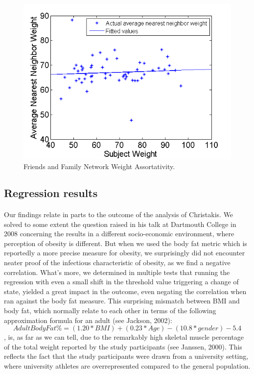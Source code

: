 \documentclass[11pt]{article}
\begin{document}
\begin{figure}[!ht]
\center
   \includegraphics[scale=0.72]{weight_assortativity_figure3.png}
   \caption{\label{3} Friends and Family Network Weight Assortativity.}
\end{figure}


\subsection{Regression results}
\paragraph{}
Our findings relate in parts to the outcome of the analysis of Christakis. We solved to some extent the question raised in his talk at Dartmouth College in 2008 concerning the results in a different socio-economic environment, where perception of obesity is different. But when we used the body fat metric which is reportedly a more precise measure for obesity, we surprisingly did not encounter neater proof of the infectious characteristic of obesity, as we find a negative correlation. What's more, we determined in multiple tests that running the regression with even a small shift in the threshold value triggering a change of state, yielded a great impact in the outcome, even negating the correlation when ran against the body fat measure. This surprising mismatch between BMI and body fat, which normally relate to each other in terms of the following approximation formula for an adult (see Jackson, 2002): 
\[Adult Body Fat \% = (1.20 * BMI) + (0.23 * Age) - (10.8 * gender) - 5.4\]
, is, as far as we can tell, due to the remarkably high skeletal muscle percentage of the total weight reported by the study participants (see Janssen, 2000). This reflects the fact that the study participants were drawn from a university setting, where university athletes are overrepresented compared to the general population. 
\end{document}
